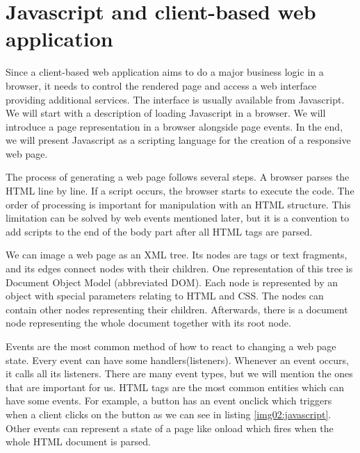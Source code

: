 \section{Javascript and client-based web application}
Since a client-based web application aims to do a major business logic in a browser, it needs to control the rendered page and access a web interface providing additional services.
The interface is usually available from Javascript.
We will start with a description of loading Javascript in a browser.
We will introduce a page representation in a browser alongside page events.
In the end, we will present Javascript as a scripting language for the creation of a responsive web page.
\par
{}
The process of generating a web page follows several steps.
A browser parses the HTML line by line. If a script occurs, the browser starts to execute the code.
The order of processing is important for manipulation with an HTML structure.
This limitation can be solved by web events mentioned later, but
it is a convention to add scripts to the end of the body part after all HTML tags are parsed.
\par
We can image a web page as an XML tree.
Its nodes are tags or text fragments, and its edges connect nodes with their children.
One representation of this tree is Document Object Model (abbreviated DOM).
Each node is represented by an object with special parameters relating to HTML and CSS. 
The nodes can contain other nodes representing their children.
Afterwards, there is a document node representing the whole document together with its root node.
\par
Events are the most common method of how to react to changing a web page state.
Every event can have some handlers(listeners).
Whenever an event occurs, it calls all its listeners.
There are many event types, but we will mention the ones that are important for us.
HTML tags are the most common entities which can have some events.
For example, a button has an event onclick which triggers when a client clicks on the button as we can see in listing \ref{img02:javascript}. 
Other events can represent a state of a page like onload which fires when the whole HTML document is parsed.
\par

